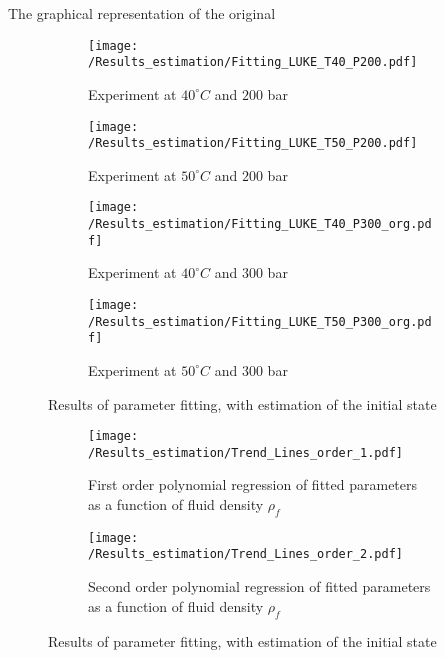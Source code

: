 \documentclass[../Article_Model_Parameters.tex]{subfiles}
\begin{document}
	The graphical representation of the original

	\begin{figure*}[!h]
		\centering
		\begin{subfigure}[b]{0.8\textwidth}
			\centering
			\texttt{[image: /Results\_estimation/Fitting\_LUKE\_T40\_P200.pdf]}
			\caption{Experiment at $40^\circ C$ and $200$ bar}
		\end{subfigure}
		\hfill
		\begin{subfigure}[b]{0.8\textwidth}
			\centering
			\texttt{[image: /Results\_estimation/Fitting\_LUKE\_T50\_P200.pdf]}
			\caption{Experiment at $50^\circ C$ and $200$ bar}
		\end{subfigure}
		\hfill
		\begin{subfigure}[b]{0.8\textwidth}
			\centering
			\texttt{[image: /Results\_estimation/Fitting\_LUKE\_T40\_P300\_org.pdf]}
			\caption{Experiment at $40^\circ C$ and $300$ bar}
		\end{subfigure}
		\hfill
		\begin{subfigure}[b]{0.8\textwidth}
			\centering
			\texttt{[image: /Results\_estimation/Fitting\_LUKE\_T50\_P300\_org.pdf]}
			\caption{Experiment at $50^\circ C$ and $300$ bar}
		\end{subfigure}
		\caption{Results of parameter fitting, with estimation of the initial state}
	\end{figure*}


	\begin{figure*}[!h]
	\centering
	\begin{subfigure}[b]{0.85\textwidth}
		\centering
		\texttt{[image: /Results\_estimation/Trend\_Lines\_order\_1.pdf]}
		\caption{First order polynomial regression of fitted parameters as a function of fluid density $\rho_f$}
	\end{subfigure}
	\hfill
	\begin{subfigure}[b]{0.85\textwidth}
		\centering
		\texttt{[image: /Results\_estimation/Trend\_Lines\_order\_2.pdf]}
		\caption{Second order polynomial regression of fitted parameters as a function of fluid density $\rho_f$}
	\end{subfigure}
	\caption{Results of parameter fitting, with estimation of the initial state}
	\end{figure*}
	
	
\end{document}
